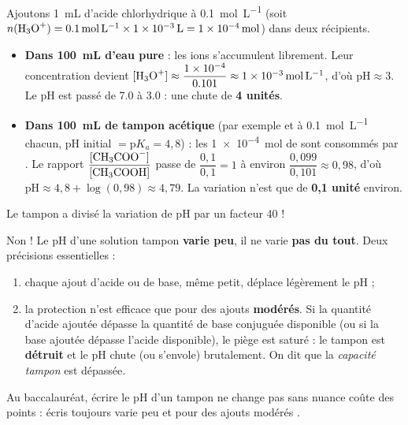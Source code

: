 \documentclass[11pt]{article}
\begin{document}
\begin{exemplebox}
Ajoutons \SI{1}{mL} d'acide chlorhydrique à \SI{0,1}{mol.L^{-1}} (soit $n(\ce{H3O+}) = \SI{0,1}{mol.L^{-1}} \times \SI{1e-3}{L} = \SI{1e-4}{mol}$) dans deux récipients.
\begin{itemize}
\item \textbf{Dans \SI{100}{mL} d'eau pure} : les ions  s'accumulent librement. Leur concentration devient $[\ce{H3O+}] \approx \dfrac{\num{1e-4}}{\num{0,101}} \approx \SI{1e-3}{mol.L^{-1}}$, d'où $\text{pH} \approx 3$. Le pH est passé de \num{7,0} à \num{3,0} : une chute de \textbf{4 unités}.
\item \textbf{Dans \SI{100}{mL} de tampon acétique} (par exemple  et  à \SI{0,1}{mol.L^{-1}} chacun, pH initial $= \text{p}K_a = 4{,}8$) : les \SI{1e-4}{mol} de  sont consommés par . Le rapport $\dfrac{[\ce{CH3COO-}]}{[\ce{CH3COOH}]}$ passe de $\dfrac{0,1}{0,1} = 1$ à environ $\dfrac{0,099}{0,101} \approx 0{,}98$, d'où $\text{pH} \approx 4{,}8 + \log(0{,}98) \approx 4{,}79$. La variation n'est que de \textbf{0,1 unité} environ.
\end{itemize}
Le tampon a divisé la variation de pH par un facteur 40 !
\end{exemplebox}

\begin{attention}
Non ! Le pH d'une solution tampon \textbf{varie peu}, il ne varie \textbf{pas du tout}. Deux précisions essentielles :
\begin{enumerate}
\item chaque ajout d'acide ou de base, même petit, déplace légèrement le pH ;
\item la protection n'est efficace que pour des ajouts \textbf{modérés}. Si la quantité d'acide ajoutée dépasse la quantité de base conjuguée  disponible (ou si la base ajoutée dépasse l'acide  disponible), le piège est saturé : le tampon est \textbf{détruit} et le pH chute (ou s'envole) brutalement. On dit que la \emph{capacité tampon} est dépassée.
\end{enumerate}
Au baccalauréat, écrire \og le pH d'un tampon ne change pas \fg{} sans nuance coûte des points : écris toujours \og varie peu \fg{} et \og pour des ajouts modérés \fg{}.
\end{attention}
\end{document}

